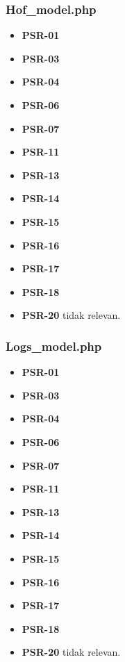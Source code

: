 \subsubsection{Hof\_model.php}
\begin{itemize}
	\item \textbf{PSR-01} 
	\item \textbf{PSR-03}
	\item \textbf{PSR-04}
	\item \textbf{PSR-06}
	\item \textbf{PSR-07}
	\item \textbf{PSR-11}
	\item \textbf{PSR-13}
	\item \textbf{PSR-14}
	\item \textbf{PSR-15}
	\item \textbf{PSR-16}
	\item \textbf{PSR-17} 
	\item \textbf{PSR-18} 
	\item \textbf{PSR-20} tidak relevan.
\end{itemize}

\subsubsection{Logs\_model.php}
\begin{itemize}
	\item \textbf{PSR-01} 
	\item \textbf{PSR-03}
	\item \textbf{PSR-04}
	\item \textbf{PSR-06}
	\item \textbf{PSR-07}
	\item \textbf{PSR-11}
	\item \textbf{PSR-13}
	\item \textbf{PSR-14}
	\item \textbf{PSR-15}
	\item \textbf{PSR-16}
	\item \textbf{PSR-17} 
	\item \textbf{PSR-18} 
	\item \textbf{PSR-20} tidak relevan.
\end{itemize}

